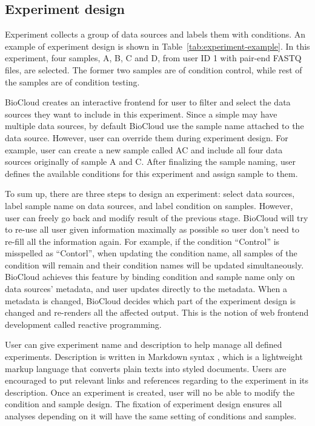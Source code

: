 \subsection{Experiment design}

Experiment collects a group of data sources and labels them with conditions. An
example of experiment design is shown in Table~\ref{tab:experiment-example}. In
this experiment, four samples, A, B, C and D, from user ID 1 with pair-end
FASTQ files, are selected. The former two samples are of condition control,
while rest of the samples are of condition testing.



BioCloud creates an interactive frontend for user to filter and select the data
sources they want to include in this experiment. Since a simple may have
multiple data sources, by default BioCloud use the sample name attached to the
data source. However, user can override them during experiment design. For
example, user can create a new sample called AC and include all four data
sources originally of sample A and C. After finalizing the sample naming, user
defines the available conditions for this experiment and assign sample to them.

To sum up, there are three steps to design an experiment: select data sources,
label sample name on data sources, and label condition on samples. However,
user can freely go back and modify result of the previous stage. BioCloud will
try to re-use all user given information maximally as possible so user don't
need to re-fill all the information again. For example, if the condition
``Control'' is misspelled as ``Contorl'', when updating the condition name, all
samples of the condition will remain and their condition names will be updated
simultaneously. BioCloud achieves this feature by binding condition and sample
name only on data sources' metadata, and user updates directly to the metadata.
When a metadata is changed, BioCloud decides which part of the experiment
design is changed and re-renders all the affected output. This is the notion of
web frontend development called reactive programming.

User can give experiment name and description to help manage all defined
experiments. Description is written in Markdown syntax \cite{:commonmark},
which is a lightweight markup language that converts plain texts into styled
documents. Users are encouraged to put relevant links and references regarding
to the experiment in its description. Once an experiment is created, user will
no be able to modify the condition and sample design. The fixation of
experiment design ensures all analyses depending on it will have the same
setting of conditions and samples.


